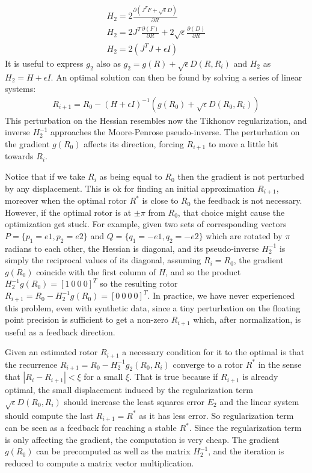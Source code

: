 \documentclass{birkjour}
\numberwithin{equation}{section}
\begin{document}
\begin{eqnarray*}
H_2 = 2 \frac{\partial(J^T F + \sqrt{\epsilon} D)}{\partial R} \\
H_2 = 2 J^T \frac{\partial(F)}{\partial R} + 2 \sqrt{\epsilon} \frac{\partial(D)}{\partial R}\\
H_2 = 2 (J^T J + \epsilon I)
\end{eqnarray*}
It is useful to express $g_2$ also as $g_2 = g(R) + \sqrt{\epsilon} D(R,R_i)$ and $H_2$ as $H_2 = H + \epsilon I$.  
An optimal solution can then be found by solving a series of linear systems:
\begin{eqnarray*}
R_{i+1} = R_0 - (H + \epsilon I)^{-1} (g(R_0) + \sqrt{\epsilon} D(R_0,R_i))
\end{eqnarray*}
This perturbation on the Hessian resembles now the Tikhonov regularization, and inverse $H_2^{-1}$ approaches the Moore-Penrose pseudo-inverse.
The perturbation on the gradient $g(R_0)$ affects its direction, forcing $R_{i+1}$ to move a little bit towards $R_i$.

Notice that if we take $R_i$ as being equal to $R_0$ then the gradient is not perturbed by any displacement. This is ok for finding an initial approximation $R_{i+1}$, moreover when the optimal rotor $R^*$ is close to $R_0$ the feedback is not necessary. However, if the optimal rotor is at $\pm \pi$ from $R_0$, that choice might cause the optimization get stuck. For example, given two sets of corresponding vectors $P = \{p_1=e1, p_2=e2\}$ and $Q = \{q_1=-e1, q_2=-e2\}$ which are rotated by $\pi$ radians to each other, the Hessian is diagonal, and its pseudo-inverse $H_2^{-1}$ is simply the reciprocal values of its diagonal, assuming $R_i = R_0$, the gradient $g(R_0)$ coincide with the first column of $H$, and so the product $H_2^{-1} g(R_0) = [1 \ 0 \ 0 \ 0]^T$ so the resulting rotor $R_{i+1} = R_0 - H_2^{-1} g(R_0) = [0 \ 0 \ 0 \ 0]^T$. In practice, we have never experienced this problem, even with synthetic data, since a tiny perturbation on the floating point precision is sufficient to get a non-zero $R_{i+1}$ which, after normalization, is useful as a feedback direction.

Given an estimated rotor $R_{i+1}$ a necessary condition for it to the optimal is that the recurrence $R_{i+1} = R_0 - H_2^{-1} g_2(R_0,R_i)$ converge to a rotor $R^*$ in the sense that $|R_i - R_{i+1}| < \xi$ for a small $\xi$. That is true because if $R_{i+1}$ is already optimal, the small displacement induced by the regularization term $\sqrt{\epsilon} D(R_0,R_i)$ should increase the least squares error $E_2$ and the linear system should compute the last $R_{i+1} = R^*$ as it has less error. So regularization term can be seen as a feedback for reaching a stable $R^*$. Since the regularization term is only affecting the gradient, the computation is very cheap. The gradient $g(R_0)$ can be precomputed as well as the matrix $H_2^{-1}$, and the iteration is reduced to compute a matrix vector multiplication.
\end{document}
